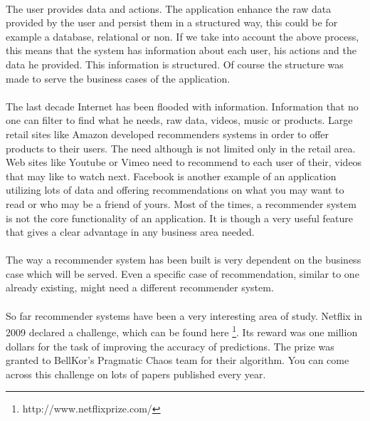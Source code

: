 \paragraph{} The user provides data and actions. The application enhance the raw data provided by the user and persist them in a structured way, this could be for example a database, relational or non. If we take into account the above process, this means that the system has information about each user, his actions and the data he provided. This information is structured. Of course the structure was made to serve the business cases of the application.


\paragraph{} The last decade Internet has been flooded with information. Information that no one can filter to find what he needs, raw data, videos, music or products. Large retail sites like Amazon developed recommenders systems in order to offer products to their users. The need although is not limited only in the retail area. Web sites like Youtube or Vimeo need to recommend to each user of their, videos that may like to watch next. Facebook is another example of an application utilizing lots of data and offering recommendations on what you may want to read or who may be a friend of yours. Most of the times, a recommender system is not the core functionality of an application. It is though a very useful feature that gives a clear advantage in any business area needed.

\paragraph{}The way a recommender system has been built is very dependent on the business case which will be served. Even a specific case of recommendation, similar to one already existing, might need a different recommender system.

\paragraph{} So far recommender systems have been a very interesting area of study. Netflix in 2009 declared a challenge, which can be found here \footnote{http://www.netflixprize.com/}. Its  reward was one million dollars for the task of improving the accuracy of predictions. The prize was granted to BellKor’s Pragmatic Chaos team for their algorithm. You can come across this challenge on lots of papers published every year.

